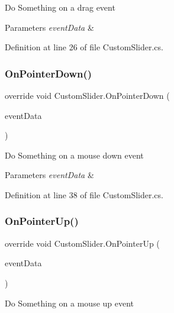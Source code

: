 Do Something on a drag event 


\begin{DoxyParams}{Parameters}
{\em event\+Data} & \\
\hline
\end{DoxyParams}


Definition at line 26 of file Custom\+Slider.\+cs.

\mbox{\label{class_custom_slider_aae8edd3090cb3e61060301a6bfe143b6}} 
\subsubsection{\texorpdfstring{On\+Pointer\+Down()}{OnPointerDown()}}
{\footnotesize\ttfamily override void Custom\+Slider.\+On\+Pointer\+Down (\begin{DoxyParamCaption}\item[{Pointer\+Event\+Data}]{event\+Data }\end{DoxyParamCaption})}



Do Something on a mouse down event 


\begin{DoxyParams}{Parameters}
{\em event\+Data} & \\
\hline
\end{DoxyParams}


Definition at line 38 of file Custom\+Slider.\+cs.

\mbox{\label{class_custom_slider_a5bf03e20d8dd4e6a4918949efbfa9cf8}} 
\subsubsection{\texorpdfstring{On\+Pointer\+Up()}{OnPointerUp()}}
{\footnotesize\ttfamily override void Custom\+Slider.\+On\+Pointer\+Up (\begin{DoxyParamCaption}\item[{Pointer\+Event\+Data}]{event\+Data }\end{DoxyParamCaption})}



Do Something on a mouse up event 


